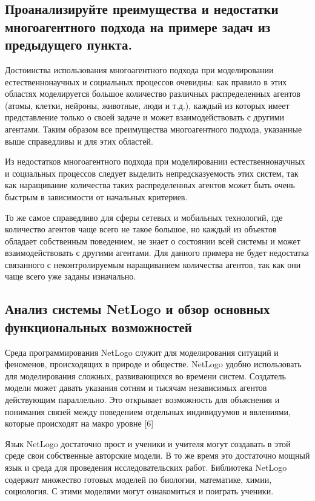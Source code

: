 \documentclass[14pt,a4paper,report]{report}
\begin{document}
\subsection{Проанализируйте преимущества и недостатки многоагентного подхода на примере задач из предыдущего пункта.}

Достоинства использования многоагентного подхода при моделировании естественнонаучных и социальных процессов очевидны: как правило в этих областях моделируется большое количество различных распределенных агентов (атомы, клетки, нейроны, животные, люди и т.д.), каждый из которых имеет представление только о своей задаче и может взаимодействовать с другими агентами. Таким образом все преимущества многоагентного подхода, указанные выше справедливы и для этих областей.

Из недостатков многоагентного подхода при моделировании естественнонаучных и социальных процессов следует выделить непредсказуемость этих систем, так как наращивание количества таких распределенных агентов может быть очень быстрым в зависимости от начальных критериев. 

То же самое справедливо для сферы сетевых и мобильных технологий, где количество агентов чаще всего не такое большое, но каждый из объектов обладает собственным поведением, не знает о состоянии всей системы и может взаимодействовать с другими агентами. Для данного примера не будет недостатка связанного с неконтролируемым наращиванием количества агентов, так как они чаще всего уже заданы изначально.

\subsection{Анализ системы NetLogo и обзор основных функциональных возможностей}

Среда программирования NetLogo служит для моделирования ситуаций и феноменов, происходящих в природе и обществе. NetLogo удобно использовать для моделирования сложных, развивающихся во времени систем. Создатель модели может давать указания сотням и тысячам независимых агентов действующим параллельно. Это открывает возможность для объяснения и понимания связей между поведением отдельных индивидуумов и явлениями, которые происходят на макро уровне [6]

Язык NetLogo достаточно прост и ученики и учителя могут создавать в этой среде свои собственные авторские модели. В то же время это достаточно мощный язык и среда для проведения исследовательских работ. Библиотека NetLogo содержит множество готовых моделей по биологии, математике, химии, социология. С этими моделями могут ознакомиться и поиграть ученики.
\end{document}
